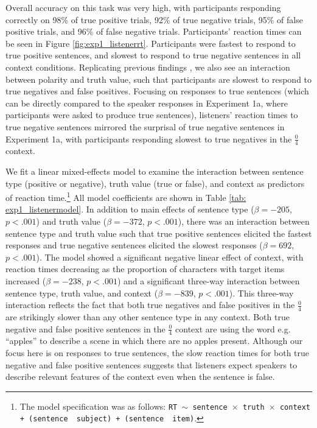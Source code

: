 \documentclass[man, floatsintext, noapacite]{apa6}
\begin{document}
Overall accuracy on this task was very high, with participants responding correctly on 98\% of true positive trials, 92\% of true negative trials, 95\% of false positive trials, and 96\% of false negative trials.  Participants' reaction times can be seen in Figure \ref{fig:exp1_listenerrt}. Participants were fastest to respond to true positive sentences, and slowest to respond to true negative sentences in all context conditions. Replicating previous findings \cite{hclark1972}, we also see an interaction between polarity and truth value, such that participants are slowest to respond to true negatives and false positives. Focusing on responses to true sentences (which can be directly compared to the speaker responses in Experiment 1a, where participants were asked to produce true sentences), listeners' reaction times to true negative sentences mirrored the surprisal of true negative sentences in Experiment 1a, with participants responding slowest to true negatives in the $\frac{0}{4}$ context.

We fit a linear mixed-effects model to examine the interaction between sentence type (positive or negative), truth value (true or false), and context as predictors of reaction time.\footnote{The model specification was as follows: \texttt{RT $\sim$ sentence~$\times$~truth~$\times$~context + (sentence~\textbar~subject) +  (sentence~\textbar~item)}.} All model coefficients are shown in Table \ref{tab: exp1_listenermodel}. In addition to main effects of sentence type ($\beta= -205$, $p< .001$) and truth value ($\beta= -372$, $p< .001$), there was an interaction between sentence type and truth value such that true positive sentences elicited the fastest responses and true negative sentences elicited the slowest responses ($\beta= 692$, $p< .001$). The model showed a significant negative linear effect of context, with reaction times decreasing as the proportion of characters with target items increased ($\beta= -238$, $p< .001$) and a significant three-way interaction between sentence type, truth value, and context ($\beta= -839$, $p< .001$).  This three-way interaction reflects the fact that both true negatives and false positives in the $\frac{0}{4}$ are strikingly slower than any other sentence type in any context. Both true negative and false positive sentences in the $\frac{0}{4}$ context are using the word e.g. ``apples'' to describe a scene in which there are no apples present. Although our focus here is on responses to true sentences, the slow reaction times for both true negative and false positive sentences suggests that listeners expect speakers to describe relevant features of the context even when the sentence is false. 
\end{document}
